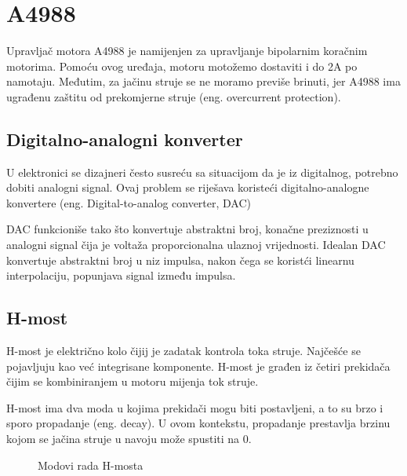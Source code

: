 \documentclass[../Document.tex]{subfiles}
\begin{document}
\section{A4988} \label{acdoo}
Upravljač motora A4988 je namijenjen za upravljanje bipolarnim koračnim motorima. Pomoću ovog uređaja, motoru motožemo dostaviti i do 2A po namotaju. Međutim, za jačinu struje se ne moramo previše brinuti, jer A4988 ima ugrađenu zaštitu od prekomjerne struje (eng. overcurrent protection).

\subsection{Digitalno-analogni konverter}
U elektronici se dizajneri često susreću sa situacijom da je iz digitalnog, potrebno dobiti analogni signal. Ovaj problem se riješava koristeći digitalno-analogne konvertere (eng. Digital-to-analog converter, DAC)

DAC funkcioniše tako što konvertuje abstraktni broj, konačne preziznosti u analogni signal čija je voltaža proporcionalna ulaznoj vrijednosti. Idealan DAC konvertuje abstraktni broj u niz impulsa, nakon čega se koristći linearnu interpolaciju, popunjava signal između impulsa.

\subsection{H-most}
H-most je električno kolo čijij je zadatak kontrola toka struje. Najčešće se pojavljuju kao već integrisane komponente. H-most je građen iz četiri prekidača čijim se kombiniranjem u motoru mijenja tok struje.


H-most ima dva moda u kojima prekidači mogu biti postavljeni, a to su brzo i sporo propadanje (eng. decay). U ovom kontekstu, propadanje prestavlja brzinu kojom se jačina struje u navoju može spustiti na 0.

\begin{figure}
    \centering
    \qquad
    \caption{Modovi rada H-mosta}%
\end{figure}
\end{document}
